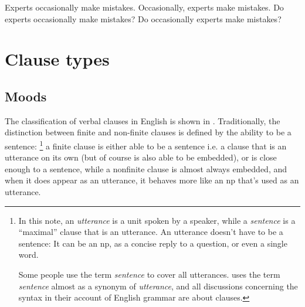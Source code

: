 \documentclass[UTF8, a4paper, oneside, scheme=plain, 12pt]{ctexbook}
\newcommand*{\citepage}[1]{p.~{#1}}
\newcommand*{\term}[1]{\emph{#1}}
\begin{document}
\begin{exe}
    \ex Experts occasionally make mistakes.
    \ex Occasionally, experts make mistakes.
    \ex Do experts occasionally make mistakes?
    \ex *Do occasionally experts make mistakes?
\end{exe}

\section{Clause types}

\subsection{Moods}\label{sec:moods}

The classification of verbal clauses in English is shown in .
Traditionally, the distinction between finite and non-finite clauses 
is defined by the ability to be a sentence:%
\footnote{
    In this note, an \term{utterance} is a unit spoken by a speaker,
    while a \term{sentence} is a ``maximal'' clause that is an utterance.
    An utterance doesn't have to be a sentence:
    It can be an \acs{np}, as a concise reply to a question,
    or even a single word.

    Some people use the term \term{sentence} to cover all utterances.
    \citet[\citepage{45}, \citepage{853}]{cgel} uses the term \term{sentence} 
    almost as a synonym of \term{utterance},
    and all discussions concerning the syntax in their account of English grammar are about clauses.
} 
a finite clause is either able to be a sentence i.e. a clause that is an utterance on its own
(but of course is also able to be embedded),
or is close enough to a sentence,
while a nonfinite clause is almost always embedded,
and when it does appear as an utterance,
it behaves more like an \acs{np} that's used as an utterance.
\end{document}

